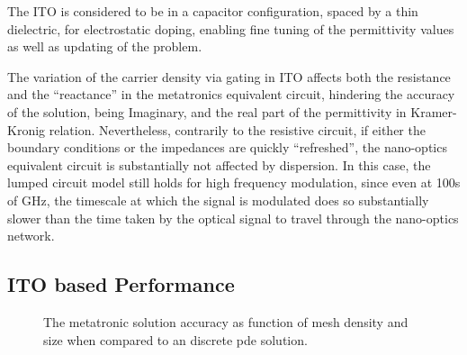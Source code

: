 \par The ITO is considered to be in a capacitor configuration, spaced by a thin dielectric, for electrostatic doping, enabling fine tuning of the permittivity values as well as updating of the problem. 

\par The variation of the carrier density via gating in ITO affects both the resistance and the ``reactance''  in the metatronics equivalent circuit, hindering the accuracy of the solution, being Imaginary, and the real part of the permittivity in Kramer-Kronig relation. Nevertheless, contrarily to the resistive circuit, if either the boundary conditions or the impedances are quickly ``refreshed'', the nano-optics equivalent circuit is substantially not affected by dispersion. In this case, the lumped circuit model still holds for high frequency modulation, since even at 100s of GHz, the timescale at which the signal is modulated does so substantially slower than the time taken by the optical signal to travel through the nano-optics network.

\subsection{\label{sec:Performance} ITO based Performance}

\begin{figure}[ht]
\centering{}
\caption{The metatronic solution accuracy as function of mesh density and size when compared to an discrete \acrshort{pde} solution.}
\label{fig:metatronic_accuracy}
\end{figure}

